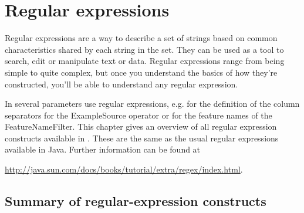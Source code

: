\chapter{Regular expressions}
\label{sec:regular_expressions}

Regular expressions are a way to describe a set of strings based on common
characteristics shared by each string in the set. They can be used as a tool
to search, edit or manipulate text or data. Regular expressions range from
being simple to quite complex, but once you understand the basics of how
they're constructed, you'll be able to understand any regular expression.

In \rapidminer several parameters use regular expressions, e.g. for the definition
of the column separators for the ExampleSource operator or for the feature
names of the FeatureNameFilter. This chapter gives an
overview of all regular expression constructs available in \rapidminer. These are
the same as the usual regular expressions available in Java. Further
information can be found at
\begin{center}
\url{http://java.sun.com/docs/books/tutorial/extra/regex/index.html}.
\end{center}



\section{Summary of regular-expression constructs}


